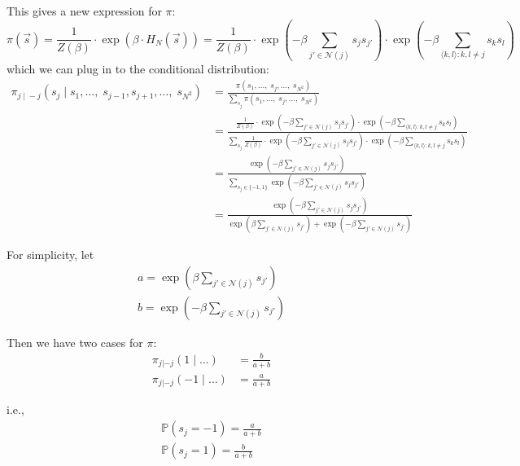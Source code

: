\documentclass[12pt]{article}
\renewcommand{\P}{\mathbb{P}}
\newcommand{\brak}[1]{\langle #1 \rangle}
\begin{document}
        This gives a new expression for $\pi$:
        \[\pi(\vec s) = \frac{1}{Z(\beta)} \cdot \exp(\beta\cdot H_N(\vec s)) = \frac{1}{Z(\beta)} \cdot \exp\left(-\beta \sum_{j' \in \mathcal{N}(j)} s_j s_{j'}\right) \cdot \exp\left(-\beta \sum_{\brak{k, l}: k, l \neq j} s_k s_l\right)\]
        which we can plug in to the conditional distribution:
        \begin{align*}
            \pi_{j \; | \; -j}(s_j \; | \; s_1, \dots,\; s_{j-1}, s_{j+1}, \dots,\; s_{N^2}) &= \frac{\pi(s_1, \dots,\; s_j, \dots,\; s_{N^2})}{\sum_{s_j} \pi(s_1, \dots,\; s_j, \dots,\; s_{N^2})}\\
            &= \frac{ \frac{1}{Z(\beta)} \cdot \exp\left(-\beta \sum_{j' \in \mathcal{N}(j)} s_j s_{j'}\right) \cdot \exp\left(-\beta \sum_{\brak{k, l}: k, l \neq j} s_k s_l\right)}{\sum_{s_j}  \frac{1}{Z(\beta)} \cdot \exp\left(-\beta \sum_{j' \in \mathcal{N}(j)} s_j s_{j'}\right) \cdot \exp\left(-\beta \sum_{\brak{k, l}: k, l \neq j} s_k s_l\right)}\\
            &= \frac{\exp\left(-\beta \sum_{j' \in \mathcal{N}(j)} s_j s_{j'}\right)}{\sum_{s_j \in \{-1, 1\}} \exp\left(-\beta \sum_{j' \in \mathcal{N}(j)} s_j s_{j'}\right)}\\
            &= \frac{\exp\left(-\beta \sum_{j' \in \mathcal{N}(j)} s_j s_{j'}\right)}{\exp\left(\beta \sum_{j' \in \mathcal{N}(j)} s_{j'}\right) + \exp\left(-\beta \sum_{j' \in \mathcal{N}(j)} s_{j'}\right)}
        \end{align*}

        For simplicity, let 
        \begin{align*}
            a = \exp\left(\beta \sum_{j' \in \mathcal{N}(j)} s_{j'}\right)\\
            b = \exp\left(-\beta \sum_{j' \in \mathcal{N}(j)} s_{j'}\right)
        \end{align*}

        Then we have two cases for $\pi$:
        \begin{align*}
            \pi_{j  | -j}(1 \; | \; \dots) &= \frac{b}{a + b}\\
            \pi_{j  | -j}(-1 \; | \; \dots) &= \frac{a}{a + b}
        \end{align*}

        i.e., 
        \begin{align*}
            \P(s_j = -1) = \frac{a}{a + b}\\
            \P(s_j = 1) = \frac{b}{a + b} 
        \end{align*}
\end{document}
